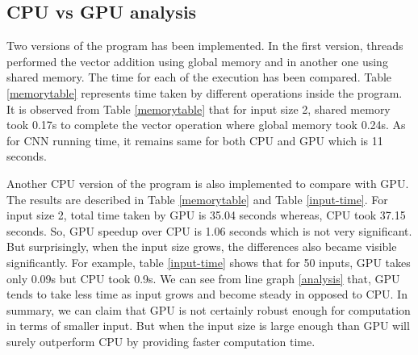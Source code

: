 \documentclass[11pt]{article}       %
\begin{document}
\subsection{CPU vs GPU analysis } \label{CPU-GPU}
Two versions of the program has been implemented. In the first version, threads performed the vector addition using global memory and in another one using shared memory. The time for each of the execution has been compared. Table \ref{memorytable} represents time taken by different operations inside the program. It is observed from Table \ref{memorytable} that for input size 2, shared memory took  0.17s to complete the vector operation where global memory took 0.24s. As for CNN running time, it remains same for both CPU and GPU which is 11 seconds. \newline

Another CPU version of the program is also implemented to compare with GPU. The results are described in Table \ref{memorytable} and Table \ref{input-time}. For input size 2, total time taken by GPU is 35.04 seconds whereas, CPU took 37.15 seconds. So, GPU speedup over CPU is 1.06 seconds which is not very significant.    But surprisingly, when the input size grows, the differences also became visible significantly. For example, table \ref{input-time} shows that for 50 inputs, GPU takes only 0.09s but CPU took 0.9s. We can see from line graph \ref{analysis} that, GPU tends to take less time as input grows and become steady in opposed to CPU. In summary, we can claim that GPU is not certainly robust enough for computation in terms of smaller input. But when the input size is large enough than GPU will surely outperform CPU by providing faster computation time.     
\end{document}

